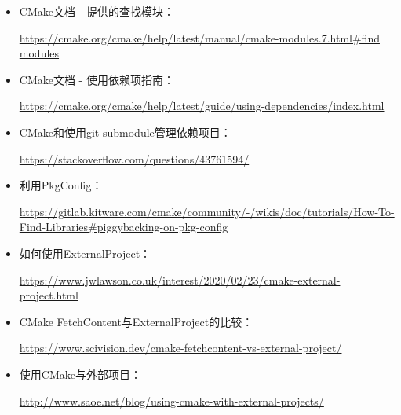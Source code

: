 

\begin{itemize}
\item
CMake文档 - 提供的查找模块：

\url{https://cmake.org/cmake/help/latest/manual/cmake-modules.7.html#find modules}

\item
CMake文档 - 使用依赖项指南：

\url{https://cmake.org/cmake/help/latest/guide/using-dependencies/index.html}

\item
CMake和使用git-submodule管理依赖项目：

\url{https://stackoverflow.com/questions/43761594/}

\item
利用PkgConfig：

\url{https://gitlab.kitware.com/cmake/community/-/wikis/doc/tutorials/How-To-Find-Libraries#piggybacking-on-pkg-config}

\item
如何使用ExternalProject：

\url{https://www.jwlawson.co.uk/interest/2020/02/23/cmake-external-project.html}

\item
CMake FetchContent与ExternalProject的比较：

\url{https://www.scivision.dev/cmake-fetchcontent-vs-external-project/}

\item
使用CMake与外部项目：

\url{http://www.saoe.net/blog/using-cmake-with-external-projects/}
\end{itemize}


















